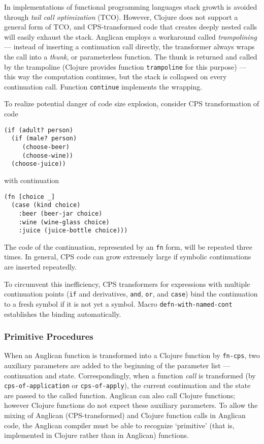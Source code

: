\documentclass[preprint]{sigplanconf}
\begin{document}
In implementations of functional programming languages stack
growth is avoided through \textit{tail call optimization} (TCO).
However, Clojure does not support a general form of TCO, and
CPS-transformed code that creates deeply nested calls will
easily exhaust the stack. Anglican employs a workaround called
\textit{trampolining} --- instead of inserting a continuation
call directly, the transformer always wraps the call into a
\textit{thunk}, or parameterless function. The thunk is returned
and called by the trampoline (Clojure provides function
\texttt{trampoline} for this purpose) --- this way the
computation continues, but the stack is collapsed on every
continuation call. Function \texttt{continue} implements the
wrapping.

To realize potential danger of code size explosion, consider
CPS transformation of code
\begin{lstlisting}[style=default]
(if (adult? person)
  (if (male? person)
     (choose-beer)
     (choose-wine))
  (choose-juice))
\end{lstlisting}
with continuation 
\begin{lstlisting}[style=default]
(fn [choice _]
  (case (kind choice)
    :beer (beer-jar choice)
    :wine (wine-glass choice)
    :juice (juice-bottle choice)))
\end{lstlisting}
The code of the continuation, represented by an \texttt{fn}
form, will be repeated three times. In general, CPS code can
grow extremely large if symbolic continuations are inserted
repeatedly.

To circumvent this inefficiency, CPS transformers for
expressions with multiple continuation points (\texttt{if} and
derivatives, \texttt{and}, \texttt{or}, and \texttt{case}) bind
the continuation to a fresh symbol if it is not yet a symbol.
Macro \texttt{defn-with-named-cont} establishes the binding
automatically.

\subsubsection{Primitive Procedures}

When an Anglican function is transformed into a Clojure function
by \texttt{fn-cps}, two auxiliary parameters are added to the
beginning of the parameter list --- continuation and state.
Correspondingly, when a function \textit{call} is transformed
(by \texttt{cps-of-application} or \texttt{cps-of-apply}), the
current continuation and the state are passed to the called
function. Anglican can also call Clojure functions; however
Clojure functions do not expect these auxiliary parameters.
To allow the mixing of Anglican (CPS-transformed) and Clojure
function calls in Anglican code, the Anglican compiler must be
able to recognize `primitive' (that is, implemented in Clojure
rather than in Anglican) functions. 
\end{document}
